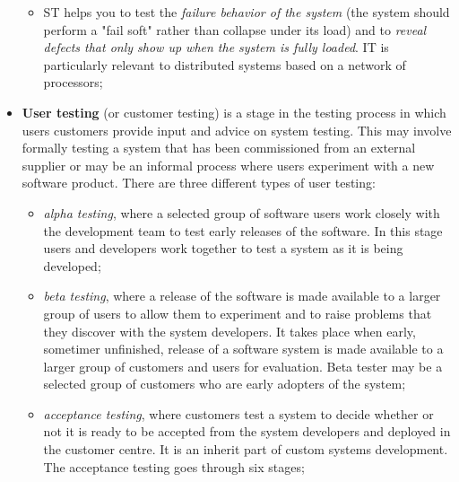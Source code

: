 \documentclass[oneside]{article}
\begin{document}
\begin{itemize}
\begin{itemize}
            \item ST helps you to test the \textit{failure behavior of the system} (the system should perform a "fail soft" rather than collapse under its load) and to \textit{reveal defects that only show up when the system is fully loaded}. IT is particularly relevant to distributed systems based on a network of processors;
        \end{itemize}
        
    \item \textbf{User testing} (or customer testing) is a stage in the testing process in which users customers provide input and advice on system testing. This may involve formally testing a system that has been commissioned from an external supplier or may be an informal process where users experiment with a new software product. There are three different types of user testing:
    
        \begin{itemize}
            \item \textit{alpha testing}, where a selected group of software users work closely with the development team to test early releases of the software. In this stage users and developers work together to test a system as it is being developed;
            \item \textit{beta testing}, where a release of the software is made available to a larger group of users to allow them to experiment and to raise problems that they discover with the system developers. It takes place when early, sometimer unfinished, release of a software system is made available to a larger group of customers and users for evaluation. Beta tester may be a selected group of customers who are early adopters of the system;
            \item \textit{acceptance testing}, where customers test a system to decide whether or not it is ready to be accepted from the system developers and deployed in the customer centre. It is an inherit part of custom systems development. The acceptance testing goes through six stages;
            \begin{figure}[!htb]
            \end{figure}
        \end{itemize}
    

\end{itemize}
\end{document}
